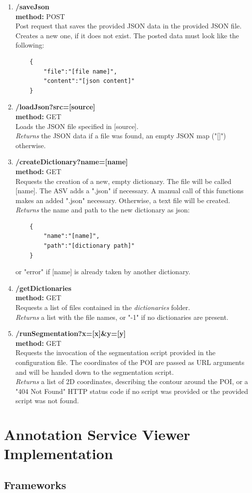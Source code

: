 \begin{enumerate}[(1) -]
	\item \textbf{/saveJson\\
	method:} POST\\
	Post request that saves the provided JSON data in the provided JSON file. Creates a new one, if it does not exist. The posted data must look like the following:
	\begin{lstlisting}
	{
		"file":"[file name]",
		"content":"[json content]"
	}
	\end{lstlisting}
		
	\item \textbf{/loadJson?src=[source]\\
	method:} GET\\
	Loads the JSON file specified in [source].\\
	\emph{Returns} the JSON data if a file was found, an empty JSON map ("[]") otherwise.
	
	\item \textbf{/createDictionary?name=[name]\\
	method:} GET\\
	Requests the creation of a new, empty dictionary. The file will be called [name]. The ASV adds a ".json" if necessary. A manual call of this functions makes an added ".json" necessary. Otherwise, a text file will be created.\\
	\emph{Returns} the name and path to the new dictionary as json:
	\begin{lstlisting}
	{
		"name":"[name]",
		"path":"[dictionary path]"
	}
	\end{lstlisting}
	or "error" if [name] is already taken by another dictionary.\clearpage
	
	\item \textbf{/getDictionaries\\
	method:} GET\\
	Requests a list of files contained in the \emph{dictionaries} folder.\\
	\emph{Returns} a list with the file names, or "-1" if no dictionaries are present.
	
	\item \textbf{/runSegmentation?x=[x]\&y=[y]\\
		method:} GET\\
	Requests the invocation of the segmentation script provided in the configuration file. The coordinates of the POI are passed as URL arguments and will be handed down to the segmentation script.\\
	\emph{Returns} a list of 2D coordinates, describing the contour around the POI, or a "404 Not Found" HTTP status code if no script was provided or the provided script was not found.
\end{enumerate}


\section{Annotation Service Viewer Implementation}
\subsection{Frameworks}

